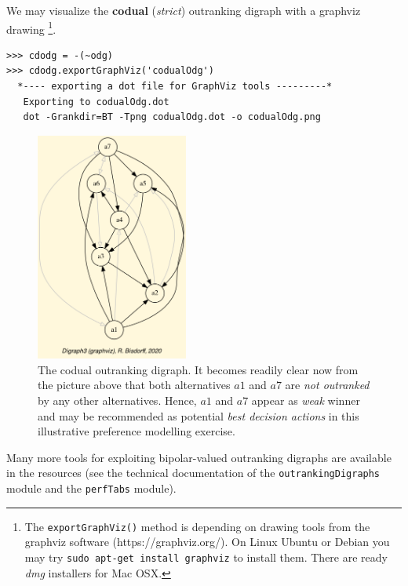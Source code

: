 We may visualize the {\bf codual} ({\em strict\/}) outranking digraph with a graphviz drawing \footnote{The \texttt{exportGraphViz()} method is depending on drawing tools from the graphviz software (https://graphviz.org/). On Linux Ubuntu or Debian you may try \texttt{sudo apt-get install graphviz} to install them. There are ready \emph{dmg} installers for Mac OSX.}.

\begin{lstlisting}
>>> cdodg = -(~odg)
>>> cdodg.exportGraphViz('codualOdg')
  *---- exporting a dot file for GraphViz tools ---------*
   Exporting to codualOdg.dot
   dot -Grankdir=BT -Tpng codualOdg.dot -o codualOdg.png
\end{lstlisting}

\begin{figure}[h]
\sidecaption
\includegraphics[width=5cm]{Figures/codualOdg.png}
\caption{The codual outranking digraph. It becomes readily clear now from the picture above that both alternatives $a1$  and $a7$ are {\em not outranked\/} by any other alternatives. Hence, $a1$  and $a7$ appear as \emph{weak} \Condorcet winner and may be recommended as potential {\em best decision actions\/} in this illustrative preference modelling exercise.}
\label{fig:3.1}       %
\end{figure}
 
Many more tools for exploiting bipolar-valued outranking digraphs are available in the  resources (see the technical documentation of the {\tt outrankingDigraphs} module and the {\tt perfTabs} module).

\clearpage
{}
{}

\typeout{}

%